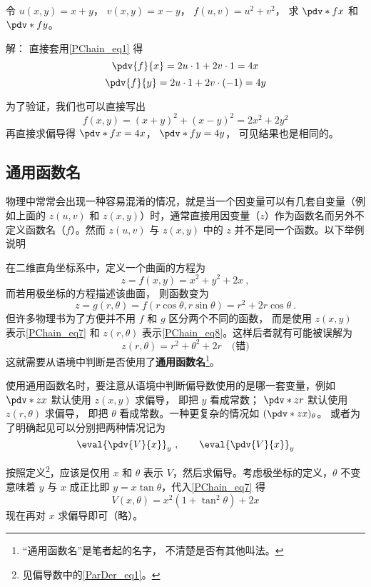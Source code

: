 \begin{example}{}
令 $u(x,y) = x + y$， $v(x,y) = x - y$， $f(u, v) = u^2 + v^2$， 求 $\pdv*{f}{x}$ 和 $\pdv*{f}{y}$。

解： 直接套用\autoref{PChain_eq1} 得
\begin{equation}
\pdv{f}{x} = 2u \cdot 1 + 2v \cdot 1 = 4x
\end{equation}
\begin{equation}
\pdv{f}{y} = 2u \cdot 1 + 2v \cdot (-1) = 4y
\end{equation}

为了验证，我们也可以直接写出
\begin{equation}
f(x, y) = (x+y)^2 + (x-y)^2 = 2x^2 + 2y^2
\end{equation}
再直接求偏导得 $\pdv*{f}{x} = 4x$， $\pdv*{f}{y} = 4y$， 可见结果也是相同的。
\end{example}

\subsection{通用函数名}
物理中常常会出现一种容易混淆的情况，就是当一个因变量可以有几套自变量（例如上面的 $z(u,v)$ 和 $z(x,y)$）时，通常直接用因变量（$z$）作为函数名而另外不定义函数名（$f$）。然而 $z(u,v)$ 与 $z(x,y)$ 中的 $z$ 并不是同一个函数。以下举例说明

\begin{example}{}\label{PChain_ex1}
在二维直角坐标系中，定义一个曲面的方程为
\begin{equation}\label{PChain_eq7}
z=f(x,y)=x^2+y^2+2x~,
\end{equation}
而若用极坐标的方程描述该曲面， 则函数变为
\begin{equation}\label{PChain_eq8}
z = g(r,\theta) = f(r\cos \theta, r\sin \theta ) = r^2 + 2r\cos \theta~.
\end{equation}
但许多物理书为了方便并不用 $f$ 和 $g$ 区分两个不同的函数， 而是使用 $z(x,y)$ 表示\autoref{PChain_eq7} 和 $z(r,\theta)$ 表示\autoref{PChain_eq8}。这样后者就有可能被误解为
\begin{equation}
z(r,\theta) = r^2+\theta^2+2r \quad \text{(错)}
\end{equation}
这就需要从语境中判断是否使用了\textbf{通用函数名}\footnote{“通用函数名”是笔者起的名字， 不清楚是否有其他叫法。}。

使用通用函数名时，要注意从语境中判断偏导数使用的是哪一套变量，例如 $\pdv*{z}{x}$ 默认使用 $z(x,y)$ 求偏导， 即把 $y$ 看成常数； $\pdv*{z}{r}$ 默认使用 $z(r,\theta)$ 求偏导， 即把 $\theta$ 看成常数。一种更复杂的情况如 $(\pdv*{z}{x})_\theta$。 或者为了明确起见可以分别把两种情况记为
\begin{equation}
\eval{\pdv{V}{x}}_y~, \qquad \eval{\pdv{V}{x}}_y
\end{equation}

按照定义\footnote{见偏导数中的\autoref{ParDer_eq1}。}，应该是仅用 $x$ 和 $\theta$ 表示 $V$，然后求偏导。考虑极坐标的定义，$\theta$ 不变意味着 $y$ 与 $x$ 成正比即 $y=x\tan\theta$，代入\autoref{PChain_eq7} 得
\begin{equation}
V(x,\theta)=x^2(1+\tan^2 \theta) + 2x
\end{equation}
现在再对 $x$ 求偏导即可（略）。
\end{example}

